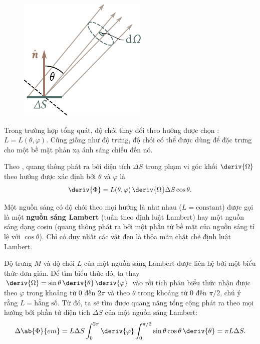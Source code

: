 \begin{figure}[!htb]
	\begin{center}
		\includegraphics[scale=1]{figures/ch_16/fig_16_5.pdf}
		\caption[]{}
		\label{fig:16_5}
	\end{center}
	\vspace{-0.8cm}
\end{figure}

Trong trường hợp tổng quát, độ chói thay đổi theo hướng được chọn : $L=L(\theta,\varphi)$.
Cũng giống như độ trưng, độ chói có thể được dùng để đặc trưng cho một bề mặt phản xạ ánh sáng chiếu đến nó.

Theo , quang thông phát ra bởi diện tích $\Delta{S}$ trong phạm vi góc khối $\deriv{\Omega}$ theo hướng được xác định bởi $\theta$ và $\varphi$ là
\begin{equation}\label{eq:16_49}
    \deriv{\Phi} = L(\theta,\varphi)\, \deriv{\Omega} \Delta{S} \cos\theta.
\end{equation}

Một nguồn sáng có độ chói theo mọi hướng là như nhau ($L = \text{constant}$) được gọi là một \textbf{nguồn sáng Lambert} (tuân theo định luật Lambert) hay một nguồn sáng dạng cosin (quang thông phát ra bởi một phần tử bề mặt của nguồn sáng tỉ lệ với $\cos\theta$).
Chỉ có duy nhất các vật đen là thỏa mãn chặt chẽ định luật Lambert.

Độ trưng $M$ và độ chói $L$ của một nguồn sáng Lambert được liên hệ bởi một biểu thức đơn giản.
Để tìm biểu thức đó, ta thay $\deriv{\Omega}= \sin\theta\,\deriv{\theta}\,\deriv{\varphi}$ vào  rồi tích phân biểu thức nhận được theo $\varphi$ trong khoảng từ $0$ đến $2\pi$ và theo $\theta$ trong khoảng từ $0$ đến $\pi/2$, chú ý rằng $L=\text{hằng số}$.
Từ đó, ta sẽ tìm được quang năng tổng cộng phát ra theo mọi hướng bởi phần tử diện tích $\Delta{S}$ của một nguồn sáng Lambert:
\begin{equation*}
    \Delta{\ab{\Phi}{em}} = L \Delta{S} \int_0^{2\pi} \deriv{\varphi} \int_0^{\pi/2} \sin\theta \cos\theta\, \deriv{\theta} = \pi L \Delta{S}.
\end{equation*}


